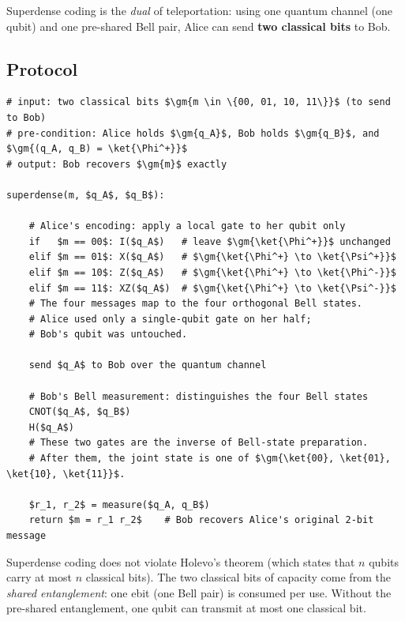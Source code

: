 \documentclass[oneside]{academica}
\begin{document}
Superdense coding is the \emph{dual} of teleportation: using one quantum channel (one qubit) and one pre-shared Bell pair, Alice can send \textbf{two classical bits} to Bob.

\subsection{Protocol}

\begin{lstlisting}
# input: two classical bits $\gm{m \in \{00, 01, 10, 11\}}$ (to send to Bob)
# pre-condition: Alice holds $\gm{q_A}$, Bob holds $\gm{q_B}$, and $\gm{(q_A, q_B) = \ket{\Phi^+}}$
# output: Bob recovers $\gm{m}$ exactly

superdense(m, $q_A$, $q_B$):

    # Alice's encoding: apply a local gate to her qubit only
    if   $m == 00$: I($q_A$)   # leave $\gm{\ket{\Phi^+}}$ unchanged
    elif $m == 01$: X($q_A$)   # $\gm{\ket{\Phi^+} \to \ket{\Psi^+}}$
    elif $m == 10$: Z($q_A$)   # $\gm{\ket{\Phi^+} \to \ket{\Phi^-}}$
    elif $m == 11$: XZ($q_A$)  # $\gm{\ket{\Phi^+} \to \ket{\Psi^-}}$
    # The four messages map to the four orthogonal Bell states.
    # Alice used only a single-qubit gate on her half;
    # Bob's qubit was untouched.

    send $q_A$ to Bob over the quantum channel

    # Bob's Bell measurement: distinguishes the four Bell states
    CNOT($q_A$, $q_B$)
    H($q_A$)
    # These two gates are the inverse of Bell-state preparation.
    # After them, the joint state is one of $\gm{\ket{00}, \ket{01}, \ket{10}, \ket{11}}$.

    $r_1, r_2$ = measure($q_A, q_B$)
    return $m = r_1 r_2$    # Bob recovers Alice's original 2-bit message
\end{lstlisting}

\begin{note}
  Superdense coding does not violate Holevo's theorem (which states that $n$ qubits carry at most $n$ classical bits).
  The two classical bits of capacity come from the \emph{shared entanglement}: one ebit (one Bell pair) is consumed per use.
  Without the pre-shared entanglement, one qubit can transmit at most one classical bit.
\end{note}
\end{document}

